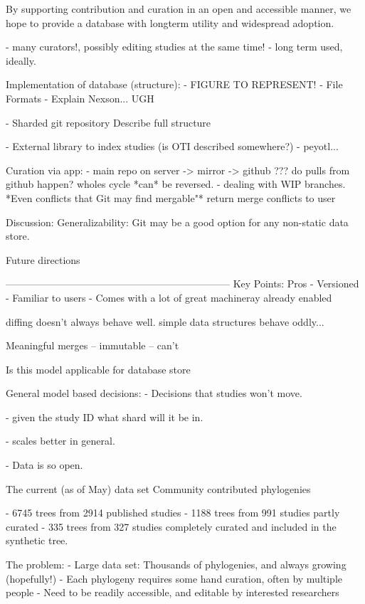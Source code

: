 \documentclass[a4paper,10pt]{article}
\begin{document}
By supporting contribution and curation in an open and accessible manner, we hope to provide a database with longterm utility and widespread adoption.

          - many curators!, possibly editing studies at the same time!
          - long term used, ideally.

          
 Implementation of database (structure):
      - FIGURE TO REPRESENT!
      - File Formats
         - Explain Nexson... UGH
         
      - Sharded git repository
          Describe full structure 
          
      - External library to index studies (is OTI described somewhere?)
      - peyotl...
      
      Curation via app:
        - main repo on server -> mirror -> github
            ??? do pulls from github happen? wholes cycle *can* be reversed.
        - dealing with WIP branches.
        *Even conflicts that Git may find mergable"*
        return merge conflicts to user

 Discussion:
   Generalizability:
      Git may be a good option for any non-static data store.
      
  Future directions

  
  
  --------------------------------------------------------------------
Key Points:
Pros
 - Versioned
 - Familiar to users
 - Comes with a lot of great machineray already enabled

diffing doesn't always behave well.
simple data structures behave oddly...

Meaningful merges
 -- immutable
 -- can't

Is this model applicable for database store

General model based decisions:
- Decisions that studies won't move.

- given the study ID what shard will it be in.

- scales better in general.

- Data is so open.



 The current (as of May) data set
 Community contributed phylogenies

 - 6745 trees from 2914 published studies
 - 1188 trees from 991 studies partly curated 
 - 335 trees from 327 studies completely curated and included in the synthetic tree.

 The problem:
 - Large data set: Thousands of phylogenies, and always growing (hopefully!)
 - Each phylogeny requires some hand curation, often by multiple people
 - Need to be readily accessible, and editable by interested researchers
\end{document}
